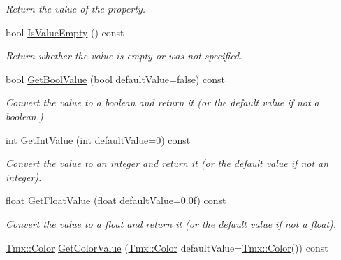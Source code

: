 \begin{DoxyCompactItemize}
\begin{DoxyCompactList}\small\item\em Return the value of the property. \end{DoxyCompactList}\item 
\hypertarget{classTmx_1_1Property_aa5612f8dc82ba4c0a8411adbba618fd0}{bool \hyperlink{classTmx_1_1Property_aa5612f8dc82ba4c0a8411adbba618fd0}{Is\-Value\-Empty} () const }\label{classTmx_1_1Property_aa5612f8dc82ba4c0a8411adbba618fd0}

\begin{DoxyCompactList}\small\item\em Return whether the value is empty or was not specified. \end{DoxyCompactList}\item 
\hypertarget{classTmx_1_1Property_a6d5936badc6223e1d6d8ffc1427e3508}{bool \hyperlink{classTmx_1_1Property_a6d5936badc6223e1d6d8ffc1427e3508}{Get\-Bool\-Value} (bool default\-Value=false) const }\label{classTmx_1_1Property_a6d5936badc6223e1d6d8ffc1427e3508}

\begin{DoxyCompactList}\small\item\em Convert the value to a boolean and return it (or the default value if not a boolean.) \end{DoxyCompactList}\item 
\hypertarget{classTmx_1_1Property_a1007a9ffdf340d29fd5ad5dce1e35c60}{int \hyperlink{classTmx_1_1Property_a1007a9ffdf340d29fd5ad5dce1e35c60}{Get\-Int\-Value} (int default\-Value=0) const }\label{classTmx_1_1Property_a1007a9ffdf340d29fd5ad5dce1e35c60}

\begin{DoxyCompactList}\small\item\em Convert the value to an integer and return it (or the default value if not an integer). \end{DoxyCompactList}\item 
\hypertarget{classTmx_1_1Property_a45b53f91382137b88a9621ebc670881d}{float \hyperlink{classTmx_1_1Property_a45b53f91382137b88a9621ebc670881d}{Get\-Float\-Value} (float default\-Value=0.\-0f) const }\label{classTmx_1_1Property_a45b53f91382137b88a9621ebc670881d}

\begin{DoxyCompactList}\small\item\em Convert the value to a float and return it (or the default value if not a float). \end{DoxyCompactList}\item 
\hypertarget{classTmx_1_1Property_a8cdbef1757c46929ae796c6761422b5a}{\hyperlink{classTmx_1_1Color}{Tmx\-::\-Color} \hyperlink{classTmx_1_1Property_a8cdbef1757c46929ae796c6761422b5a}{Get\-Color\-Value} (\hyperlink{classTmx_1_1Color}{Tmx\-::\-Color} default\-Value=\hyperlink{classTmx_1_1Color}{Tmx\-::\-Color}()) const }\label{classTmx_1_1Property_a8cdbef1757c46929ae796c6761422b5a}


\end{DoxyCompactItemize}
